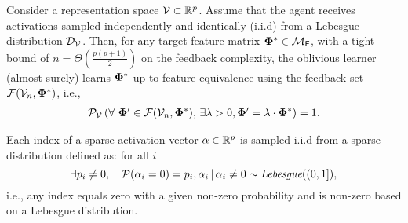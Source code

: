 
\begin{theorem}\label{thm: samplegeneral}
    Consider a representation space ${\mathcal{V}} \subset \mathbb{R}^p$. Assume that the agent receives activations sampled independently and identically (i.i.d) from a Lebesgue distribution ${\mathcal{D}}_{{\mathcal{V}}}$. Then, for any target feature matrix $\boldsymbol{\Phi}^* \in \mathcal{M}_{\textsf{F}}$, with a tight bound of $n = \Theta(\frac{p(p+1)}{2})$ on the feedback complexity, the oblivious learner (almost surely) learns $\boldsymbol{\Phi}^*$ up to feature equivalence using the feedback set ${\mathcal{F}}({\mathcal{V}}_n,\boldsymbol{\Phi}^*)$, i.e.,
    \begin{align*}
        {\mathcal{P}}_{{\mathcal{V}}}  \left( {\forall\,\, \boldsymbol{\Phi}' \in {\mathcal{F}}({\mathcal{V}}_n,\boldsymbol{\Phi}^*),\, \exists \lambda > 0, \boldsymbol{\Phi}' = \lambda\cdot \boldsymbol{\Phi}^* } \right)  = 1.
    \end{align*}
\end{theorem}



\begin{assumption}\label{ass: sparse}
    Each index of a sparse activation vector $\alpha \in \mathbb{R}^p$ is sampled i.i.d from a sparse distribution defined as: for all $i$
\begin{equation*}
\exists p_i \neq 0,\quad   {\mathcal{P}}(\alpha_i  = 0) = p_i, \alpha_i\, |\, \alpha_i \neq 0 \sim \textit{Lebesgue}((0,1]), 
\end{equation*}
i.e., any index equals zero with a given non-zero probability and is non-zero based on a Lebesgue distribution.
\end{assumption}


